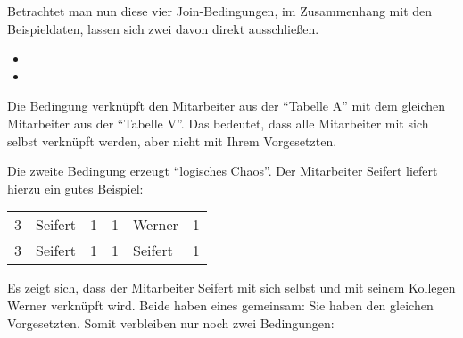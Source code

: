           Betrachtet man nun diese vier Join-Bedingungen, im Zusammenhang mit den Beispieldaten, lassen sich zwei davon direkt ausschlie\ss{}en.
          \begin{itemize}
            \item {}
            \item {}
          \end{itemize}
          Die Bedingung  verkn\"upft den Mitarbeiter aus der \enquote{Tabelle A} mit dem gleichen Mitarbeiter aus der \enquote{Tabelle V}. Das bedeutet, dass alle Mitarbeiter mit sich selbst verkn\"upft werden, aber nicht mit Ihrem Vorgesetzten.

          Die zweite Bedingung  erzeugt \enquote{logisches Chaos}. Der Mitarbeiter Seifert liefert hierzu ein gutes Beispiel:
          \begin{center}
            \begin{small}
              \tablehead{}
              \tabletail {}
              \tablelasttail {}
              \begin{msoraclesql}
                \begin{supertabular}{rlrrlr}
                  3 & Seifert & 1 & 1 & Werner & 1 \\
                  3 & Seifert & 1 & 1 & Seifert & 1 \\
                \end{supertabular}
              \end{msoraclesql}
            \end{small}
          \end{center}
          Es zeigt sich, dass der Mitarbeiter Seifert mit sich selbst und mit seinem Kollegen Werner verkn\"upft wird. Beide haben eines gemeinsam: Sie haben den gleichen Vorgesetzten. Somit verbleiben nur noch zwei Bedingungen:
